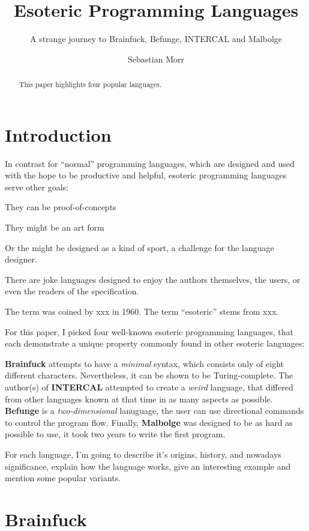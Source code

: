 \documentclass{sig-alternate}
\title{Esoteric Programming Languages}
\subtitle{A strange journey to Brainfuck, Befunge, INTERCAL and Malbolge}
\author{\alignauthor Sebastian Morr\\\email{sebastian@morr.cc}}
\begin{document}
\maketitle

\begin{abstract}
    This paper highlights four popular languages.
\end{abstract}

\section{Introduction}

In contrast for “normal” programming languages, which are designed and used with the hope to be productive and helpful, esoteric programming languages serve other goals:

They can be proof-of-concepts

They might be an art form

Or the might be designed as a kind of sport, a challenge for the language designer.

There are joke languages designed to enjoy the authors themselves, the users, or even the readers of the specification.

The term was coined by xxx in 1960. The term “esoteric” stems from xxx.

For this paper, I picked four well-known esoteric programming languages, that each demonstrate a unique property commonly found in other esoteric languages:

\textbf{Brainfuck} attempts to have a \textit{minimal} syntax, which consists only of eight different characters. Nevertheless, it can be shown to be Turing-complete. The author(s) of \textbf{INTERCAL} attempted to create a \textit{weird} language, that differed from other languages known at that time in as many aspects as possible. \textbf{Befunge} is a \textit{two-dimensional} lanuguage, the user can use directional commands to control the program flow. Finally, \textbf{Malbolge} was designed to be as hard as possible to use, it took two years to write the first program.

For each language, I'm going to describe it's origins, history, and nowadays significance, explain how the language works, give an interesting example and mention some popular variants.

\section{Brainfuck}
\end{document}
